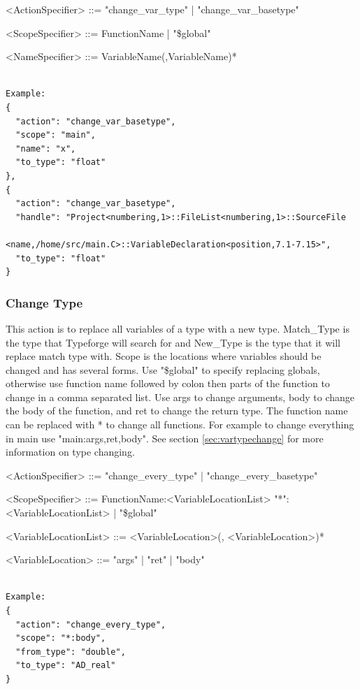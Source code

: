 \documentclass[natbib]{article}
\begin{document}
\begin{grammar}
<ActionSpecifier> ::= "change_var_type" | "change_var_basetype"

<ScopeSpecifier>    ::= FunctionName | "\$global"

<NameSpecifier>     ::= VariableName(,VariableName)*
\end{grammar}
\begin{verbatim}

Example:
{
  "action": "change_var_basetype",
  "scope": "main",
  "name": "x",
  "to_type": "float"
},
{
  "action": "change_var_basetype",
  "handle": "Project<numbering,1>::FileList<numbering,1>::SourceFile
              <name,/home/src/main.C>::VariableDeclaration<position,7.1-7.15>",
  "to_type": "float"
}
\end{verbatim}

\subsubsection{Change Type} \label{sec:chagetype}
This action is to replace all variables of a type with a new type. Match\_Type is the type that Typeforge
will search for and New\_Type is the type that it will replace match type with.
Scope is the locations where variables should be changed and has several forms. 
Use "\$global" to specify replacing globals, otherwise use function name followed by colon 
then parts of the function to change in a comma separated list. Use args to change arguments, 
body to change the body of the function, and ret to change the return type. The function name 
can be replaced with * to change all functions. For example to change everything in main use 
"main:args,ret,body". See section \ref{sec:vartypechange} for more information on type changing. 

\begin{grammar}
<ActionSpecifier>  ::= "change_every_type" | "change_every_basetype"

<ScopeSpecifier>     ::=  FunctionName:<VariableLocationList> 
\alt "*":<VariableLocationList> | "\$global"

<VariableLocationList> ::= <VariableLocation>(, <VariableLocation>)*

<VariableLocation> ::= "args" | "ret" | "body"

\end{grammar}
\begin{verbatim}

Example:
{
  "action": "change_every_type",
  "scope": "*:body",
  "from_type": "double",
  "to_type": "AD_real"
}
\end{verbatim}
\end{document}

